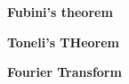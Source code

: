 \documentclass{article}
\begin{document}
\textbf{Fubini's theorem}\label{fubini}

\textbf{Toneli's THeorem}\label{tonelli}

\textbf{Fourier Transform}\label{Fourier}
\end{document}
